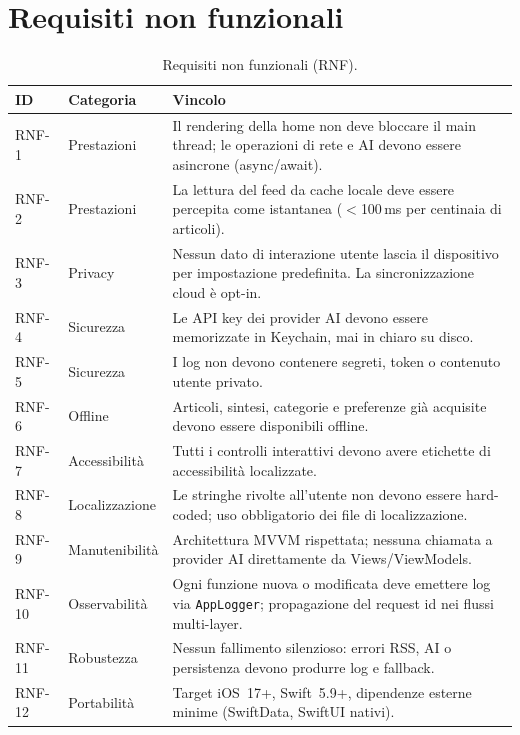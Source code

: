 \section{Requisiti non funzionali}
\begin{table}[h]
\centering
\small
\caption{Requisiti non funzionali (RNF).}
\label{tab:rnf}
\begin{tabular}{p{1.2cm}p{3cm}p{9.5cm}}
\toprule
\textbf{ID} & \textbf{Categoria} & \textbf{Vincolo} \\
\midrule
RNF-1  & Prestazioni     & Il rendering della home non deve bloccare il main thread; le operazioni di rete e AI devono essere asincrone (async/await). \\
RNF-2  & Prestazioni     & La lettura del feed da cache locale deve essere percepita come istantanea ($<$100\,ms per centinaia di articoli). \\
RNF-3  & Privacy         & Nessun dato di interazione utente lascia il dispositivo per impostazione predefinita. La sincronizzazione cloud è opt-in. \\
RNF-4  & Sicurezza       & Le API key dei provider AI devono essere memorizzate in Keychain, mai in chiaro su disco. \\
RNF-5  & Sicurezza       & I log non devono contenere segreti, token o contenuto utente privato. \\
RNF-6  & Offline         & Articoli, sintesi, categorie e preferenze già acquisite devono essere disponibili offline. \\
RNF-7  & Accessibilità   & Tutti i controlli interattivi devono avere etichette di accessibilità localizzate. \\
RNF-8  & Localizzazione  & Le stringhe rivolte all'utente non devono essere hard-coded; uso obbligatorio dei file di localizzazione. \\
RNF-9  & Manutenibilità  & Architettura MVVM rispettata; nessuna chiamata a provider AI direttamente da Views/ViewModels. \\
RNF-10 & Osservabilità   & Ogni funzione nuova o modificata deve emettere log via \texttt{AppLogger}; propagazione del request id nei flussi multi-layer. \\
RNF-11 & Robustezza      & Nessun fallimento silenzioso: errori RSS, AI o persistenza devono produrre log e fallback. \\
RNF-12 & Portabilità     & Target iOS~17+, Swift~5.9+, dipendenze esterne minime (SwiftData, SwiftUI nativi). \\
\bottomrule
\end{tabular}
\end{table}

